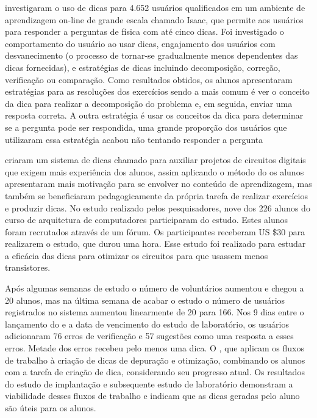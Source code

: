  investigaram  o uso de dicas para 4.652 usuários qualificados em um ambiente de aprendizagem on-line de grande escala chamado Isaac, que permite aos usuários para responder a perguntas de física com até cinco dicas. Foi investigado o comportamento do usuário ao usar dicas, engajamento dos usuários com desvanecimento (o processo de tornar-se gradualmente menos dependentes das dicas fornecidas), e estratégias de dicas incluindo decomposição, correção, verificação ou comparação. Como resultados obtidos, os alunos apresentaram estratégias para as resoluções dos exercícios sendo a mais comum é ver o conceito da dica para realizar a decomposição do problema e, em seguida, enviar uma resposta correta. A outra estratégia é usar os conceitos da dica para determinar se a pergunta pode ser respondida, uma grande proporção dos usuários que utilizaram essa estratégia acabou não tentando responder a pergunta

 criaram um sistema de dicas chamado  para auxiliar projetos de circuitos digitais que exigem mais experiência dos alunos, assim aplicando o método do  os alunos apresentaram mais motivação para se envolver no conteúdo de aprendizagem, mas também se beneficiaram pedagogicamente da própria tarefa de realizar exercícios e produzir dicas. No estudo realizado pelos pesquisadores, nove dos 226 alunos do curso de arquitetura de computadores participaram do estudo. Estes alunos foram recrutados através de um fórum. Os participantes receberam US \$30 para realizarem o estudo, que durou uma hora. Esse estudo foi realizado para estudar a eficácia das dicas para otimizar os circuitos para que usassem menos transistores. 

Após algumas semanas de estudo o número de voluntários aumentou e chegou a 20 alunos, mas na última semana de acabar o estudo o número de usuários registrados no sistema  aumentou linearmente de 20 para 166. Nos 9 dias entre o lançamento do  e a data de vencimento do estudo de laboratório, os usuários adicionaram 76 erros de verificação e 57 sugestões como uma resposta a esses erros. Metade dos erros recebeu pelo menos uma dica. O , que aplicam os fluxos de trabalho à criação de dicas de depuração e otimização, combinando os alunos com a tarefa de criação de dica, considerando seu progresso atual. Os resultados do estudo de implantação e subsequente estudo de laboratório demonstram a viabilidade desses fluxos de trabalho e indicam que as dicas geradas pelo aluno são úteis para os alunos. 

